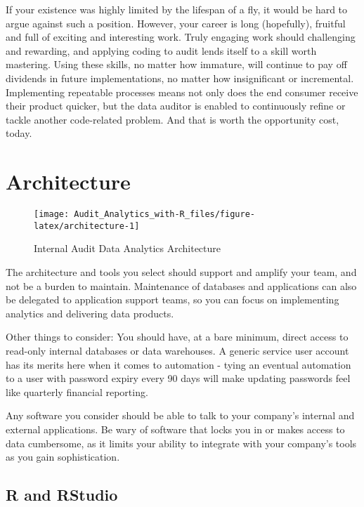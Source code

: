 \documentclass[
]{book}
\begin{document}
If your existence was highly limited by the lifespan of a fly, it would be hard to argue against such a position. However, your career is long (hopefully), fruitful and full of exciting and interesting work. Truly engaging work should challenging and rewarding, and applying coding to audit lends itself to a skill worth mastering. Using these skills, no matter how immature, will continue to pay off dividends in future implementations, no matter how insignificant or incremental. Implementing repeatable processes means not only does the end consumer receive their product quicker, but the data auditor is enabled to continuously refine or tackle another code-related problem. And that is worth the opportunity cost, today.

\hypertarget{architecture}{%
\chapter{Architecture}\label{architecture}}

\begin{figure}

{\centering \texttt{[image: Audit\_Analytics\_with-R\_files/figure-latex/architecture-1]} 

}

\caption{Internal Audit Data Analytics Architecture}\label{fig:architecture}
\end{figure}

The architecture and tools you select should support and amplify your team, and not be a burden to maintain. Maintenance of databases and applications can also be delegated to application support teams, so you can focus on implementing analytics and delivering data products.

Other things to consider: You should have, at a bare minimum, direct access to read-only internal databases or data warehouses. A generic service user account has its merits here when it comes to automation - tying an eventual automation to a user with password expiry every 90 days will make updating passwords feel like quarterly financial reporting.

Any software you consider should be able to talk to your company's internal and external applications. Be wary of software that locks you in or makes access to data cumbersome, as it limits your ability to integrate with your company's tools as you gain sophistication.

\hypertarget{r-and-rstudio}{%
\section{R and RStudio}\label{r-and-rstudio}}
\end{document}
